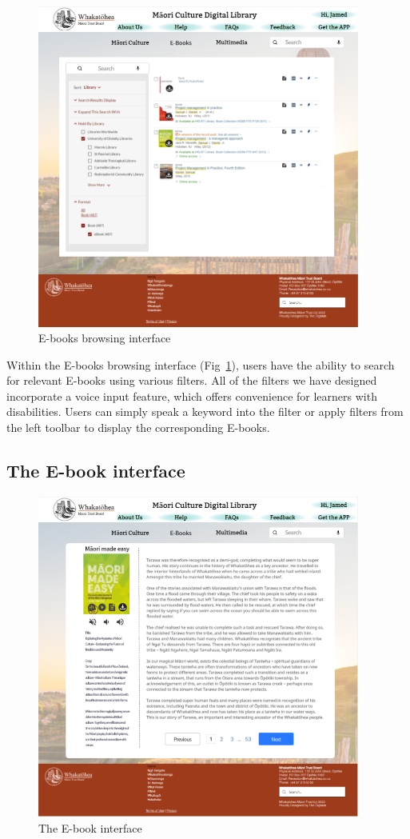 \begin{figure}[htbp]
  \centerline{\includegraphics[width=300pt]{images/3-2-1.png}}
  \caption{E-books browsing interface}
  \label{fig3.2.1}
\end{figure}

Within the E-books browsing interface (Fig~\ref{fig3.2.1}), users have the ability to search for relevant E-books using various filters. All of the filters we have designed incorporate a voice input feature, which offers convenience for learners with disabilities. Users can simply speak a keyword into the filter or apply filters from the left toolbar to display the corresponding E-books.

\subsection{The E-book interface}

\begin{figure}[htbp]
  \centerline{\includegraphics[width=300pt]{images/3-2-2.png}}
  \caption{The E-book interface}
  \label{fig3.2.2}
\end{figure}

